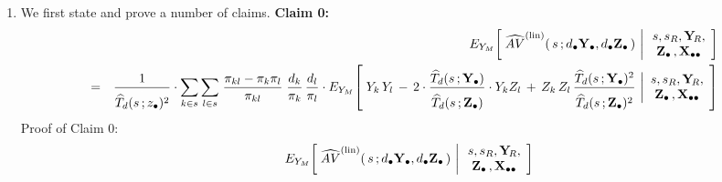 \begin{enumerate}
\begin{eqnarray*}
{            \,\right)
    $
    }
    \end{eqnarray*}
\item
    We first state and prove a number of claims.
    \vskip 0.3cm
    \noindent
    \textbf{Claim 0:}\quad
    \begin{eqnarray*}
    &&
        E_{Y_{M}}\!\left[\;
            \widehat{AV}^{\textnormal{(lin)}}(\,s\,;\dbullet\Ydot,\dbullet\Zdot\,)
            \,\left\vert\,
            \begin{array}{c}
                s,s_{R},\YsubR, \\ \Zdot\,,\Xobs
                \end{array}
            \right.
            \!\right]
    \\
    & = &
        \dfrac{1}{
            \overset{{\color{white}.}}{\widehat{T}_{d}(s\,;\zdot)^{2}}
            }
        \cdot
        \underset{k \in s}{\sum}\,
        \underset{l \in s}{\sum}\;
        \dfrac{\pi_{kl} - \pi_{k}\pi_{l}}{\pi_{kl}}\;
        \dfrac{d_{k}}{\pi_{k}}\,
        \dfrac{d_{l}}{\pi_{l}}
        \cdot
        E_{Y_{M}}\!\left[\;
            Y_{k}\,Y_{l}
            \, - \,
            {\color{black}2}
            \cdot
            \dfrac{
                \widehat{T}_{d}(s\,;\Ydot)
                }{
                \overset{{\color{white}.}}{\widehat{T}_{d}(s\,;\Zdot)}
                }
            \cdot
            {\color{black}Y_{k}Z_{l}}
            \, + \,
            Z_{k}\,Z_{l}\,
            \dfrac{
                \widehat{T}_{d}(s\,;\Ydot)^{2}
                }{
                \overset{{\color{white}.}}{\widehat{T}_{d}(s\,;\Zdot)^{2}}
                }
            \,\left\vert
            \begin{array}{c}
                s,s_{R},\YsubR, \\ \Zdot\,,\Xobs
                \end{array}
            \right.
            \!\right]
    \end{eqnarray*}
    \vskip 0.1cm
    \noindent
    Proof of Claim 0:\;\;
    \begin{eqnarray*}
    &&
        E_{Y_{M}}\!\left[\;
            \widehat{AV}^{\textnormal{(lin)}}(\,s\,;\dbullet\Ydot,\dbullet\Zdot\,)
            \,\left\vert\,
            \begin{array}{c}
                s,s_{R},\YsubR, \\ \Zdot\,,\Xobs
                \end{array}
            \right.
            \!\right]
    \\

\end{eqnarray*}
\end{enumerate}
